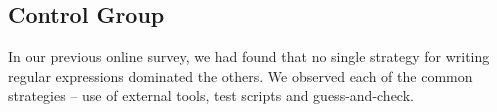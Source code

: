 \documentclass[10pt, conference, compsocconf]{IEEEtran}
\begin{document}
%
%	
%		
%		
%		
%		
%		
%		
%		
%		
%		
%		
%	
%	
%		
%		
%		
%		
%	
%




\subsection{Control Group}
In our previous online survey, we had found that no single strategy for writing regular expressions dominated the others.  We observed each of the common strategies -- use of external tools, test scripts and guess-and-check.
\end{document}
